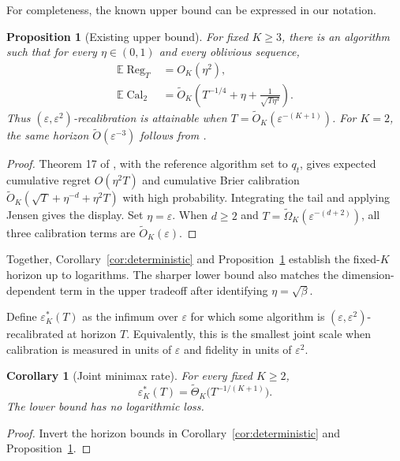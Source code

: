 \documentclass[twoside]{article}
\newtheorem{corollary}{Corollary}
\newtheorem{proposition}{Proposition}
\newcommand{\E}{\mathbb E}
\newcommand{\caltwo}{\operatorname{Cal}_2}
\newcommand{\Reg}{\operatorname{Reg}}
\newcommand{\1}{\mathbf 1}
\begin{document}
For completeness, the known upper bound can be expressed in our notation.

\begin{proposition}[Existing upper bound]\label{prop:upper}
For fixed $K\geq3$, there is an algorithm such that for every $\eta\in(0,1)$ and every oblivious sequence,
\begin{align*}
 \E\Reg_T&=O_K(\eta^2),\\
 \E\caltwo&=\widetilde O_K\!\left(
 T^{-1/4}+\eta+\frac1{\sqrt{T\eta^d}}\right).
\end{align*}
Thus $(\varepsilon,\varepsilon^2)$-recalibration is attainable when $T=\widetilde O_K(\varepsilon^{-(K+1)})$. For $K=2$, the same horizon $\widetilde O(\varepsilon^{-3})$ follows from \citet{hu2026optimal}.
\end{proposition}

\begin{proof}
Theorem 17 of \citet{chen2026calibeating}, with the reference algorithm set to $q_t$, gives expected cumulative regret $O(\eta^2T)$ and cumulative Brier calibration $\widetilde O_K(\sqrt T+\eta^{-d}+\eta^2T)$ with high probability. Integrating the tail and applying Jensen gives the display. Set $\eta=\varepsilon$. When $d\geq2$ and $T=\widetilde\Omega_K(\varepsilon^{-(d+2)})$, all three calibration terms are $\widetilde O_K(\varepsilon)$.
\end{proof}

Together, Corollary~\ref{cor:deterministic} and Proposition~\ref{prop:upper} establish the fixed-$K$ horizon up to logarithms. The sharper lower bound also matches the dimension-dependent term in the upper tradeoff after identifying $\eta=\sqrt\beta$.

Define $\varepsilon_K^*(T)$ as the infimum over $\varepsilon$ for which some algorithm is $(\varepsilon,\varepsilon^2)$-recalibrated at horizon $T$. Equivalently, this is the smallest joint scale when calibration is measured in units of $\varepsilon$ and fidelity in units of $\varepsilon^2$.

\begin{corollary}[Joint minimax rate]\label{cor:rate}
For every fixed $K\geq2$, \[ \varepsilon_K^*(T)=\widetilde\Theta_K \bigl(T^{-1/(K+1)}\bigr). \] The lower bound has no logarithmic loss.
\end{corollary}

\begin{proof}
Invert the horizon bounds in Corollary~\ref{cor:deterministic} and Proposition~\ref{prop:upper}.
\end{proof}
\end{document}
